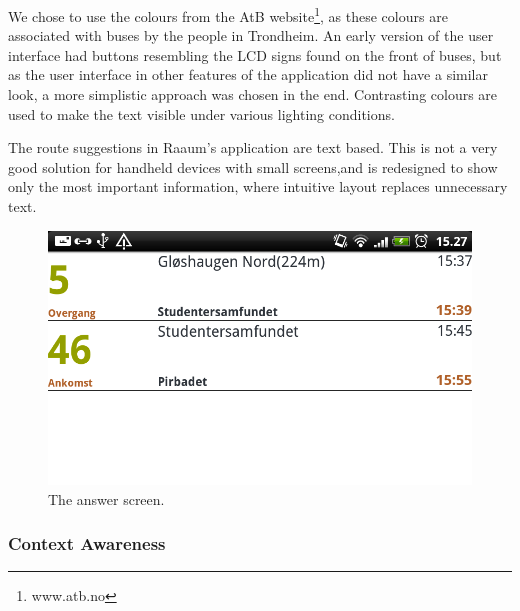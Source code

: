 We chose to use the colours from the AtB website\footnote{www.atb.no}, as these colours are associated with buses by the people in Trondheim.
An early version of the user interface had buttons resembling the LCD signs found on the front of buses, but as the user interface in other features of the application did not have a similar look, a more simplistic approach was chosen in the end. Contrasting colours are used to make the text visible under various lighting conditions.

The route suggestions in Raaum's application are text based. This is not a very good solution for handheld devices with small screens,and is redesigned to show only the most important information, where intuitive layout replaces unnecessary text.

\begin{figure}[!h]
\begin{center}
\includegraphics[width=0.5\linewidth]{DesigningGUI/suggestion.png}
\caption{The answer screen.}
\end{center}
\end{figure}

\subsubsection{Context Awareness}
\label{sec:contextawareness}

